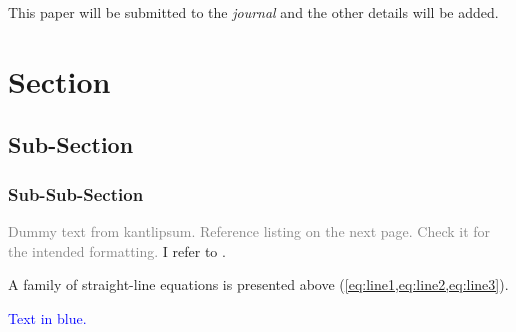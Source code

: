 {This paper will be submitted to the \emph{journal} and the other details will be added.}

\checkBeginRefsection%

\kant[20-21]

\section{Section}
\subsection{Sub-Section}
\subsubsection{Sub-Sub-Section}

\textcolor{gray}{Dummy text from kantlipsum. Reference listing on the next page. Check it for the intended formatting.} I refer to \citep{butin2009education, rudestam2014surviving, Goossens2008g,cassuto2010advising,pires2021teens}. 

\kant[8]


\kant[9]


A family of straight-line equations is presented above (\cref{eq:line1,eq:line2,eq:line3}).

\kant[10]

\textcolor{blue}{Text in blue.}

\kant[2-5]

\newpage

\checkEndRefsection%
